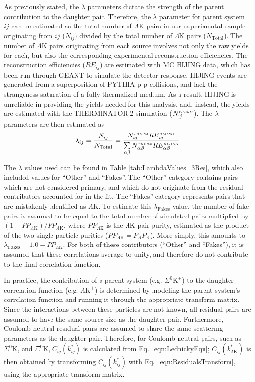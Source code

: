 \documentclass[ALICE,manyauthors]{cernphprep}
\newcommand{\KchP}{$\mathrm{K^{+}}$\xspace}
\newcommand{\LamK}{$\Lambda$K\xspace}
\newcommand{\LamKchP}{$\Lambda\mathrm{K^{+}}$\xspace}
\begin{document}
 
As previously stated, the $\lambda$ parameters dictate the strength of the parent contribution to the daughter pair.  
Therefore, the $\lambda$ parameter for parent system $ij$ can be estimated as the total number of \LamK pairs in our experimental sample originating from $ij$ ($N_{ij}$) divided by the total number of \LamK pairs ($N_{\mathrm{Total}}$).
The number of \LamK pairs originating from each source involves not only the raw yields for each, but also the corresponding experimental reconstruction efficiencies.
The reconstruction efficiencies ($RE_{ij}$) are estimated with MC HIJING data, which has been run through GEANT to simulate the detector response.
HIJING events are generated from a superposition of PYTHIA p-p collisions, and lack the strangeness saturation of a fully thermalized medium.
As a result, HIJING is unreliable in providing the yields needed for this analysis, and, instead, the yields are estimated with the THERMINATOR 2 simulation ($N_{ij}^{\scaleto{THERM}{3pt}}$).
The $\lambda$ parameters are then estimated as
\begin{equation}
\lambda_{ij} = \frac{N_{ij}}{N_{\mathrm{Total}}} = \frac{N_{ij}^{\scaleto{THERM}{3pt}}RE_{ij}^{\scaleto{HIJING}{3pt}}}{\sum\limits_{\alpha\beta} N_{\alpha\beta}^{\scaleto{THERM}{3pt}}RE_{\alpha\beta}^{\scaleto{HIJING}{3pt}}}
\end{equation}


The $\lambda$ values used can be found in Table \ref{tab:LambdaValues_3Res}, which also included values for ``Other'' and ``Fakes''.  
The ``Other'' category contains pairs which are not considered primary, and which do not originate from the residual contributors accounted for in the fit.  
The ``Fakes'' category represents pairs that are mistakenly identified as \LamK.  
To estimate this $\lambda_{\mathrm{Fakes}}$ value, the number of fake pairs is assumed to be equal to the total number of simulated pairs multiplied by $(1-PP_{\Lambda\mathrm{K}})/PP_{\Lambda\mathrm{K}}$, where $PP_{\Lambda\mathrm{K}}$ is the \LamK pair purity, estimated as the product of the two single-particle purities ($PP_{\Lambda\mathrm{K}} = P_{\Lambda}P_{\mathrm{K}}$).
More simply, this amounts to $\lambda_{\mathrm{Fakes}} = 1.0-PP_{\Lambda\mathrm{K}}$.
For both of these contributors (``Other'' and ``Fakes''), it is assumed that these correlations average to unity, and therefore do not contribute to the final correlation function.

In practice, the contribution of a parent system (e.g. $\Sigma^{0}$\KchP) to the daughter correlation function (e.g. \LamKchP) is determined by modeling the parent system's correlation function and running it through the appropriate transform matrix.
Since the interactions between these particles are not known, all residual pairs are assumed to have the same source size as the daughter pair.
Furthermore, Coulomb-neutral residual pairs are assumed to share the same scattering parameters as the daughter pair.
Therefore, for Coulomb-neutral pairs, such as $\Sigma^{0}$K, and $\Xi^{0}$K, $C_{ij}(k^{*}_{ij})$ is calculated from Eq.\ \ref{eqn:LednickyEqn}; $C_{ij}(k^{*}_{\Lambda\mathrm{K}})$ is then obtained by transforming $C_{ij}(k^{*}_{ij})$ with Eq.\ \ref{eqn:ResidualsTransform}, using the appropriate transform matrix.  
\end{document}
